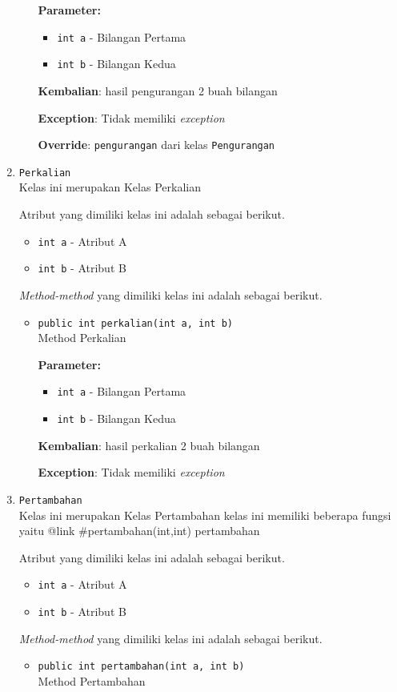 \documentclass{article}
\begin{document}
\begin{enumerate}
\begin{itemize}
\textbf{Parameter:}
\begin{itemize}
\item \texttt{int a} - 
Bilangan Pertama
\item \texttt{int b} - 
Bilangan Kedua
\end{itemize}
\textbf{Kembalian}: hasil pengurangan 2 buah bilangan

\textbf{Exception}: Tidak memiliki \textit{exception}

\textbf{Override}: \texttt{pengurangan} dari kelas \texttt{Pengurangan}

\end{itemize}
\item \texttt{Perkalian}\\ 
Kelas ini merupakan Kelas Perkalian

Atribut yang dimiliki kelas ini adalah sebagai berikut.
\begin{itemize}
\item \texttt{int a} - Atribut A
\item \texttt{int b} - Atribut B
\end{itemize}
\textit{Method-method} yang dimiliki kelas ini adalah sebagai berikut.
\begin{itemize}
\item \texttt{public int perkalian(int a, int b)}\\ 
Method Perkalian

\textbf{Parameter:}
\begin{itemize}
\item \texttt{int a} - 
Bilangan Pertama
\item \texttt{int b} - 
Bilangan Kedua
\end{itemize}
\textbf{Kembalian}: hasil perkalian 2 buah bilangan

\textbf{Exception}: Tidak memiliki \textit{exception}

\end{itemize}
\item \texttt{Pertambahan}\\ 
Kelas ini merupakan Kelas Pertambahan kelas ini memiliki beberapa fungsi
 yaitu {@link #pertambahan(int,int) pertambahan}

Atribut yang dimiliki kelas ini adalah sebagai berikut.
\begin{itemize}
\item \texttt{int a} - Atribut A
\item \texttt{int b} - Atribut B
\end{itemize}
\textit{Method-method} yang dimiliki kelas ini adalah sebagai berikut.
\begin{itemize}
\item \texttt{public int pertambahan(int a, int b)}\\ 
Method Pertambahan


\end{itemize}
\end{enumerate}
\end{document}
